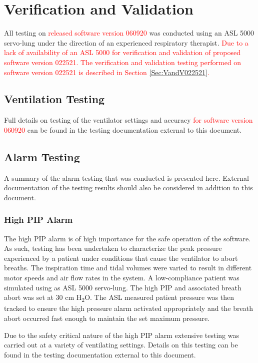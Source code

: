 \documentclass[]{article}
\begin{document}
\clearpage
\section{Verification and Validation}
\label{sect:vandv}


All testing on \textcolor{red}{released software version 060920} was conducted using an ASL 5000 servo-lung under the direction of an experienced respiratory therapist. \textcolor{red}{Due to a lack of availability of an ASL 5000 for verification and validation of proposed software version 022521. The verification and validation testing performed on software version 022521 is described in Section \ref{Sec:VandV022521}.}

\subsection{Ventilation Testing}

Full details on testing of the ventilator settings and accuracy \textcolor{red}{for software version 060920} can be found in the testing documentation external to this document.

\subsection{Alarm Testing}

A summary of the alarm testing that was conducted is presented here.  External documentation of the testing results should also be considered in addition to this document.

\subsubsection{High PIP Alarm}
The high PIP alarm is of high importance for the safe operation of the software.  As such, testing has been undertaken to characterize the peak pressure experienced by a patient under conditions that cause the ventilator to abort breaths.  The inspiration time and tidal volumes were varied to result in different motor speeds and air flow rates in the system.  A low-compliance patient was simulated using as ASL 5000 servo-lung.  The high PIP and associated breath abort was set at 30 cm H\textsubscript{2}O.  The ASL measured patient pressure was then tracked to ensure the high pressure alarm activated appropriately and the breath abort occurred fast enough to maintain the set maximum pressure.

Due to the safety critical nature of the high PIP alarm extensive testing was carried out at a variety of ventilating settings.  Details on this testing can be found in the testing documentation external to this document.
\end{document}
